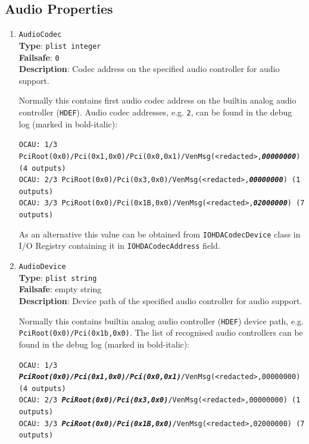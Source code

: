 \documentclass[]{article}
\makeatletter
\renewcommand{\label}[1]{%
\zref@wrapper@immediate{\oldlabel{#1}}}  %
\makeatother
\begin{document}
\begin{enumerate}
\end{enumerate}


\subsection{Audio Properties}\label{uefiaudioprops}

\begin{enumerate}

\item
  \texttt{AudioCodec}\\
  \textbf{Type}: \texttt{plist\ integer}\\
  \textbf{Failsafe}: \texttt{0}\\
  \textbf{Description}: Codec address on the specified audio controller for audio support.

  Normally this contains first audio codec address on the builtin analog audio controller (\texttt{HDEF}).
  Audio codec addresses, e.g. \texttt{2}, can be found in the debug log (marked in bold-italic):

  \texttt{OCAU: 1/3 PciRoot(0x0)/Pci(0x1,0x0)/Pci(0x0,0x1)/VenMsg(<redacted>,\textit{\textbf{00000000}}) (4 outputs)}\\
  \texttt{OCAU: 2/3 PciRoot(0x0)/Pci(0x3,0x0)/VenMsg(<redacted>,\textit{\textbf{00000000}}) (1 outputs)}\\
  \texttt{OCAU: 3/3 PciRoot(0x0)/Pci(0x1B,0x0)/VenMsg(<redacted>,\textit{\textbf{02000000}}) (7 outputs)}

  As an alternative this value can be obtained from \texttt{IOHDACodecDevice} class in I/O Registry
  containing it in \texttt{IOHDACodecAddress} field.

\item
  \texttt{AudioDevice}\\
  \textbf{Type}: \texttt{plist\ string}\\
  \textbf{Failsafe}: empty string\\
  \textbf{Description}: Device path of the specified audio controller for audio support.

  Normally this contains builtin analog audio controller (\texttt{HDEF}) device path,
  e.g. \texttt{PciRoot(0x0)/Pci(0x1b,0x0)}. The list of recognised audio controllers can be
  found in the debug log (marked in bold-italic):

  \texttt{OCAU: 1/3 \textit{\textbf{PciRoot(0x0)/Pci(0x1,0x0)/Pci(0x0,0x1)}}/VenMsg(<redacted>,00000000) (4 outputs)}\\
  \texttt{OCAU: 2/3 \textit{\textbf{PciRoot(0x0)/Pci(0x3,0x0)}}/VenMsg(<redacted>,00000000) (1 outputs)}\\
  \texttt{OCAU: 3/3 \textit{\textbf{PciRoot(0x0)/Pci(0x1B,0x0)}}/VenMsg(<redacted>,02000000) (7 outputs)}


\end{enumerate}
\end{document}
